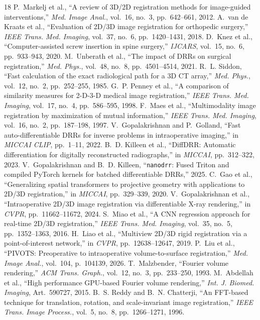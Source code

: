 \documentclass[runningheads]{llncs}
\begin{document}

\begin{thebibliography}{18}
P.~Markelj et al., ``A review of 3D/2D registration methods for image-guided interventions,'' \emph{Med. Image Anal.}, vol.~16, no.~3, pp.~642--661, 2012.
A.~van de Kraats et al., ``Evaluation of 2D/3D image registration for orthopedic surgery,'' \emph{IEEE Trans. Med. Imaging}, vol.~37, no.~6, pp.~1420--1431, 2018.
D.~Knez et al., ``Computer-assisted screw insertion in spine surgery,'' \emph{IJCARS}, vol.~15, no.~6, pp.~933--943, 2020.
M.~Unberath et al., ``The impact of DRRs on surgical registration,'' \emph{Med. Phys.}, vol.~48, no.~8, pp.~4501--4514, 2021.
R.~L. Siddon, ``Fast calculation of the exact radiological path for a 3D CT array,'' \emph{Med. Phys.}, vol.~12, no.~2, pp.~252--255, 1985.
G.~P. Penney et al., ``A comparison of similarity measures for 2-D-3-D medical image registration,'' \emph{IEEE Trans. Med. Imaging}, vol.~17, no.~4, pp.~586--595, 1998.
F.~Maes et al., ``Multimodality image registration by maximization of mutual information,'' \emph{IEEE Trans. Med. Imaging}, vol.~16, no.~2, pp.~187--198, 1997.
V.~Gopalakrishnan and P.~Golland, ``Fast auto-differentiable DRRs for inverse problems in intraoperative imaging,'' in \emph{MICCAI CLIP}, pp.~1--11, 2022.
B.~D. Killeen et al., ``DiffDRR: Automatic differentiation for digitally reconstructed radiographs,'' in \emph{MICCAI}, pp.~312--322, 2023.
V.~Gopalakrishnan and B.~D. Killeen, ``\texttt{nanodrr}: Fused Triton and compiled PyTorch kernels for batched differentiable DRRs,'' 2025.
C.~Gao et al., ``Generalizing spatial transformers to projective geometry with applications to 2D/3D registration,'' in \emph{MICCAI}, pp.~329--339, 2020.
V.~Gopalakrishnan et al., ``Intraoperative 2D/3D image registration via differentiable X-ray rendering,'' in \emph{CVPR}, pp.~11662--11672, 2024.
S.~Miao et al., ``A CNN regression approach for real-time 2D/3D registration,'' \emph{IEEE Trans. Med. Imaging}, vol.~35, no.~5, pp.~1352--1363, 2016.
H.~Liao et al., ``Multiview 2D/3D rigid registration via a point-of-interest network,'' in \emph{CVPR}, pp.~12638--12647, 2019.
P.~Liu et al., ``PIVOTS: Preoperative to intraoperative volume-to-surface registration,'' \emph{Med. Image Anal.}, vol.~104, p.~104139, 2026.
T.~Malzbender, ``Fourier volume rendering,'' \emph{ACM Trans. Graph.}, vol.~12, no.~3, pp.~233--250, 1993.
M.~Abdellah et al., ``High performance GPU-based Fourier volume rendering,'' \emph{Int. J. Biomed. Imaging}, Art.~590727, 2015.
B.~S. Reddy and B.~N. Chatterji, ``An FFT-based technique for translation, rotation, and scale-invariant image registration,'' \emph{IEEE Trans. Image Process.}, vol.~5, no.~8, pp.~1266--1271, 1996.
\end{thebibliography}
\end{document}
